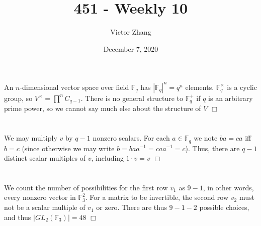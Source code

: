 \documentclass{article}
\title{451 - Weekly 10}
\author{Victor Zhang}
\date{December 7, 2020}
\begin{document}
\maketitle

\section{}
An $n$-dimensional vector space over field $\mathbb{F}_q$ has $|\mathbb{F}_q|^n = q^n$ elements. $\mathbb{F}_q^\times$ is a cyclic group, so $V^\times = \prod\limits^n C_{q-1}$. There is no general structure to $\mathbb{F}_q^+$ if $q$ is an arbitrary prime power, so we cannot say much else about the structure of $V$ $\Box$

\section{}
We may multiply $v$ by $q-1$ nonzero scalars. For each $a \in \mathbb{F}_q$ we note $ba = ca$ iff $b = c$ (since otherwise we may write $b = baa^{-1} = caa^{-1} = c$). Thus, there are $q-1$ distinct scalar multiples of $v$, including $1\cdot v = v$ $\Box$

\section{}
We count the number of possibilities for the first row $v_1$ as $9-1$, in other words, every nonzero vector in $\mathbb{F}_3^2$. For a matrix to be invertible, the second row $v_2$ must not be a scalar multiple of $v_1$ or zero. There are thus $9 - 1 - 2$ possible choices, and thus $|GL_2(\mathbb{F}_3)| = 48$ $\Box$
\end{document}
